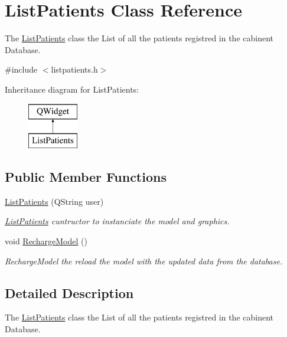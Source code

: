 \hypertarget{class_list_patients}{}\section{List\+Patients Class Reference}
\label{class_list_patients}


The \mbox{\hyperlink{class_list_patients}{List\+Patients}} class the List of all the patients registred in the cabinent Database.  




{\ttfamily \#include $<$listpatients.\+h$>$}

Inheritance diagram for List\+Patients\+:\begin{figure}[H]
\begin{center}
\leavevmode
\includegraphics[height=2.000000cm]{class_list_patients}
\end{center}
\end{figure}
\subsection*{Public Member Functions}
\begin{DoxyCompactItemize}
\item 
\mbox{\hyperlink{class_list_patients_a71c7d5fe4535c6f9b1d3c8f313902053}{List\+Patients}} (Q\+String user)
\begin{DoxyCompactList}\small\item\em \mbox{\hyperlink{class_list_patients}{List\+Patients}} cuntructor to instanciate the model and graphics. \end{DoxyCompactList}\item 
\mbox{\label{class_list_patients_a7a5cbfc1b5227d8e061ab5c4effffe3e}} 
void \mbox{\hyperlink{class_list_patients_a7a5cbfc1b5227d8e061ab5c4effffe3e}{Recharge\+Model}} ()
\begin{DoxyCompactList}\small\item\em Recharge\+Model the reload the model with the updated data from the database. \end{DoxyCompactList}\end{DoxyCompactItemize}


\subsection{Detailed Description}
The \mbox{\hyperlink{class_list_patients}{List\+Patients}} class the List of all the patients registred in the cabinent Database. 

